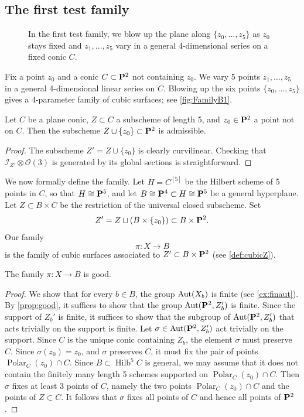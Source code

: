 \documentclass[11pt,reqno, letterpaper]{amsart}
\DeclareMathOperator{\Polar}{Polar}
\DeclareMathOperator{\Hilb}{Hilb}
\renewcommand{\to}{{\longrightarrow}}
\numberwithin{equation}{section}
\renewcommand{\O}{\mathcal O}
\begin{document}
\subsection{The first test family}
\label{sec:family-b_1}
\begin{figure}
  \centering
  
  \caption{In the first test family, we blow up the plane along $\{z_0, \dots, z_5\}$ as $z_0$ stays fixed and $z_1,\dots,z_5$ vary in a general 4-dimensional series on a fixed conic $C$.}
  \label{fig:FamilyB1}
\end{figure}
Fix a point $z_0$ and a conic $C \subset \P^2$ not containing $z_0$.
We vary 5 points $z_1, \dots, z_5$ in a general 4-dimensional linear series on $C$.
Blowing up the six points $\{z_0, \dots, z_5\}$ gives a 4-parameter family of cubic surfaces; see \autoref{fig:FamilyB1}.
\begin{proposition}
  \label{prop:B1}
  Let $C$ be a plane conic, $Z \subset C$ a subscheme of length 5, and $z_0 \in \P^2$ a point not on $C$.
  Then the subscheme $Z \cup \{z_0\} \subset \P^2$ is admissible.
\end{proposition}
\begin{proof}
  The subscheme $Z' = Z \cup \{z_0\}$ is clearly curvilinear.
  Checking that $\mathcal I_{Z'} \otimes \O(3)$ is generated by its global sections is straightforward.
\end{proof}

We now formally define the family.
Let $H = C^{[5]}$ be the Hilbert scheme of 5 points in $C$, so that $H \cong \P^5$, and let $B \cong \P^4 \subset H \cong \P^5$ be a general hyperplane.
Let $Z \subset B \times C$ be the restriction of the universal closed subscheme.
Set 
\[Z' = Z \sqcup \left(B \times \{z_0\}\right) \subset B \times \P^2.\]
Our family
\[\pi \colon X \to B\]
is the family of cubic surfaces associated to $Z' \subset B \times \P^2$ (see \autoref{def:cubicZ}).
\begin{proposition}\label{prop:goodnessB1}
  The family $\pi \colon X \to B$ is good.
\end{proposition}
\begin{proof}
  We show that for every $b \in B$, the group $\Aut(X_b)$ is finite (see \autoref{ex:finaut}).
  By \autoref{prop:good}, it suffices to show that the group $\Aut(\P^2, Z_b')$ is finite.
  Since the support of $Z_b'$ is finite, it suffices to show that the subgroup of $\Aut(\P^2, Z'_b)$ that acts trivially on the support is finite.
  Let $\sigma \in \Aut(\P^2, Z'_b)$ act trivially on the support.
  Since $C$ is the unique conic containing $Z_b$, the element $\sigma$ must preserve $C$.
  Since $\sigma(z_0) = z_0$, and $\sigma$ preserves $C$, it must fix the pair of points $\Polar_C(z_0) \cap C$.
  Since $B \subset \Hilb^5C$ is general, we may assume that it does not contain the finitely many length 5 schemes supported on $\Polar_C(z_0) \cap C$.
  Then $\sigma$ fixes at least 3 points of $C$, namely the two points $\Polar_C(z_0) \cap C$ and the points of $Z \subset C$.
  It follows that $\sigma$ fixes all points of $C$ and hence all points of $\P^2$.
\end{proof}
\end{document}
